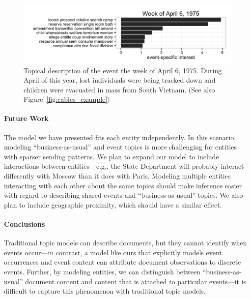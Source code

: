 \begin{figure}[ht]
\centering
\includegraphics[width=\textwidth]{fig/saigon_apr6.png}
\caption{Topical description of the event the week of April 6, 1975.  During April of this year, lost individuals were being tracked down and children were evacuated in mass from South Vietnam. (See also Figure~\ref{fig:cables_example})}
\label{fig:saigon_april}
\end{figure}

\paragraph{Future Work}  The model we have presented fits each entity independently. In this scenario, modeling ``business-as-usual'' and event topics is more challenging for entities with sparser sending patterns.
We plan to expand our model to include interactions between entities---e.g., the State Department will probably interact differently with Moscow than it does with Paris.
Modeling multiple entities interacting with each other about the same topics should make inference easier with regard to describing shared events and ``business-as-usual'' topics.  We also plan to include geographic proximity, which should have a similar effect.

\paragraph{Conclusions} Traditional topic models can describe documents, but they cannot identify when events occur---in contrast, a model like ours that explicitly models event occurrences and event content can attribute document observations to discrete events.  Further, by modeling entities, we can distinguish between ``business-as-usual'' document content and content that is attached to particular events---it is difficult to capture this phenomenon with traditional topic models.








\newpage
\appendix
